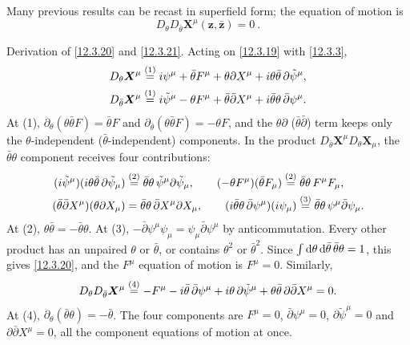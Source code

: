 Many previous results can be recast in superfield form; the equation of motion is
\begin{equation}
	D_{\theta}D_{\bar{\theta}}\bm{X}^{\mu}(\bm{z},\bar{\bm{z}})=0\:. \label{12.3.21}
\end{equation}
\begin{tcolorbox}[breakable]
	\begin{remark}
		Derivation of \eqref{12.3.20} and \eqref{12.3.21}. Acting on \eqref{12.3.19} with \eqref{12.3.3},
		\begin{align*}
			D_{\theta}\bm X^{\mu}&\overset{(1)}{=} i\psi^{\mu}+\bar\theta F^{\mu}+\theta\partial X^{\mu}+i\theta\bar\theta\,\partial\tilde\psi^{\mu},\\
			D_{\bar\theta}\bm X^{\mu}&\overset{(1)}{=} i\tilde\psi^{\mu}-\theta F^{\mu}+\bar\theta\bar\partial X^{\mu}+i\bar\theta\theta\,\bar\partial\psi^{\mu} .
		\end{align*}
		At (1), $\partial_{\theta}(\theta\bar\theta F)=\bar\theta F$ and $\partial_{\bar\theta}(\theta\bar\theta F)=-\theta F$, and the $\theta\partial$ ($\bar\theta\bar\partial$) term keeps only the $\theta$-independent ($\bar\theta$-independent) components. In the product $D_{\bar\theta}\bm X^{\mu}D_{\theta}\bm X_{\mu}$, the $\bar\theta\theta$ component receives four contributions:
		\begin{align*}
			(i\tilde\psi^{\mu})(i\theta\bar\theta\,\partial\tilde\psi_{\mu})&\overset{(2)}{=}\bar\theta\theta\,\tilde\psi^{\mu}\partial\tilde\psi_{\mu},\qquad
			(-\theta F^{\mu})(\bar\theta F_{\mu})\overset{(2)}{=}\bar\theta\theta\,F^{\mu}F_{\mu},\\
			(\bar\theta\bar\partial X^{\mu})(\theta\partial X_{\mu})&=\bar\theta\theta\,\bar\partial X^{\mu}\partial X_{\mu},\qquad
			(i\bar\theta\theta\,\bar\partial\psi^{\mu})(i\psi_{\mu})\overset{(3)}{=}\bar\theta\theta\,\psi^{\mu}\bar\partial\psi_{\mu} .
		\end{align*}
		At (2), $\theta\bar\theta=-\bar\theta\theta$. At (3), $-\bar\partial\psi^{\mu}\psi_{\mu}=\psi_{\mu}\bar\partial\psi^{\mu}$ by anticommutation. Every other product has an unpaired $\theta$ or $\bar\theta$, or contains $\theta^{2}$ or $\bar\theta^{2}$. Since $\int\mathrm{d}\theta\,\mathrm{d}\bar\theta\,\bar\theta\theta=1$, this gives \eqref{12.3.20}, and the $F^{\mu}$ equation of motion is $F^{\mu}=0$. Similarly,
		\begin{align*}
			D_{\theta}D_{\bar\theta}\bm X^{\mu}
			\overset{(4)}{=} -F^{\mu}-i\bar\theta\,\bar\partial\psi^{\mu}+i\theta\,\partial\tilde\psi^{\mu}+\theta\bar\theta\,\partial\bar\partial X^{\mu}=0 .
		\end{align*}
		At (4), $\partial_{\theta}(\bar\theta\theta)=-\bar\theta$. The four components are $F^{\mu}=0$, $\bar\partial\psi^{\mu}=0$, $\partial\tilde\psi^{\mu}=0$ and $\partial\bar\partial X^{\mu}=0$, all the component equations of motion at once.
	\end{remark}
\end{tcolorbox}
